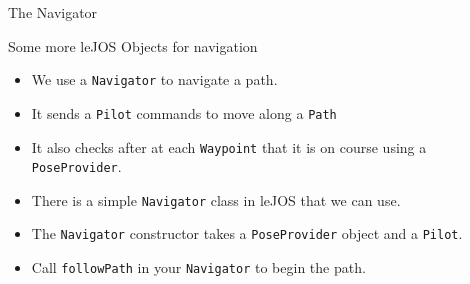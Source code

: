 \documentclass[color=pdftex,usenames,dvipsnames, aspectratio=169]{beamer}
\begin{document}
\begin{frame}[plain]
\end{frame}


\begin{frame}{The Navigator}
\begin{block}{Some more leJOS Objects for navigation}
\begin{itemize}
\item We use a \lstinline!Navigator! to navigate a path.
\item It sends a \lstinline!Pilot! commands to move along a \lstinline!Path!
\item \textcolor{OliveGreen}{It also  checks after at each \lstinline!Waypoint! that it is on course using a \lstinline!PoseProvider!.}
\item There is a simple \lstinline!Navigator! class in leJOS that we can use.
\item The \lstinline!Navigator! constructor takes a \lstinline!PoseProvider! object and a \lstinline!Pilot!.
\item Call \lstinline!followPath! in your \lstinline!Navigator! to begin the path.
\end{itemize}
\end{block}
\end{frame}
\end{document}
